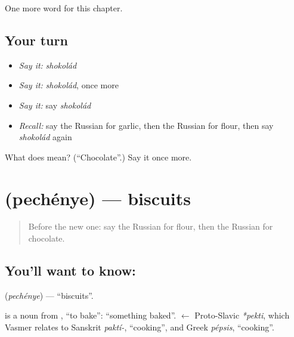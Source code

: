\begin{grammarlens}[title={What you've built}]
One more word for this chapter.
\end{grammarlens}

\subsection*{Your turn}
\begin{itemize}
\raggedright
  \item \emph{Say it:} \emph{shokolád}
  \item \emph{Say it:} \emph{shokolád}, once more
  \item \emph{Say it:} say \emph{shokolád}
  \item \emph{Recall:} say the Russian for garlic, then the Russian for flour, then say \emph{shokolád} again
\end{itemize}

\begin{tcolorbox}[breakable,colback=teal!4,colframe=teal!35!black,title={Before you move on}]
What does  mean? (\textquotedblleft{}Chocolate\textquotedblright{}.) Say it once more.
\end{tcolorbox}
\section[\texorpdfstring{\ru{печенье} (pechénye)}{печенье (pechénye)}]{ (pechénye) — biscuits}

\label{lesson:RU-C105-biscuits}



\begin{quote}
Before the new one: say the Russian for flour, then the Russian for chocolate.
\end{quote}

\subsection*{You'll want to know: }
\textbf{} (\emph{pechénye}) — \textquotedblleft{}biscuits\textquotedblright{}.

\begin{cousinweb}
\textbf{} is a noun from \emph{}, \textquotedblleft{}to bake\textquotedblright{}: \textquotedblleft{}something baked\textquotedblright{}. \emph{} $\leftarrow$ Proto-Slavic \emph{*pekti}, which Vasmer relates to Sanskrit \emph{paktí-}, \textquotedblleft{}cooking\textquotedblright{}, and Greek \emph{pépsis}, \textquotedblleft{}cooking\textquotedblright{}.
\end{cousinweb}

